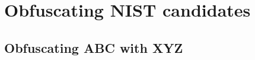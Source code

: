 \chapter{Obfuscating NIST candidates}\label{ch:results}

\section{Obfuscating ABC with XYZ} \label{sec:tbd}

